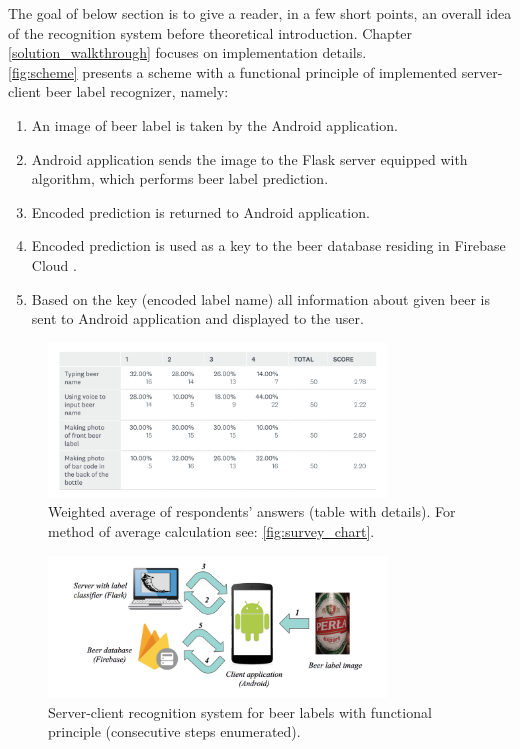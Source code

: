 \documentclass[11pt, a4paper]{article}
\begin{document}
The goal of below section is to give a reader, in a few short points, an overall idea of the recognition system before theoretical introduction. Chapter \ref{solution_walkthrough} focuses on implementation details.\\

\autoref{fig:scheme} presents a scheme with a functional principle of implemented server-client beer label recognizer, namely:
\begin{enumerate}
\item An image of beer label is taken by the Android \cite{android_guide} application. 
\item Android application sends the image to the Flask \cite{flask_docs} server equipped with algorithm, which performs beer label prediction.
\item Encoded prediction is returned to Android application.
\item Encoded prediction is used as a key to the beer database residing in Firebase Cloud \cite{firebase_database_docs}.
\item Based on the key (encoded label name) all information about given beer is sent to Android application and displayed to the user.
\end{enumerate}

\begin{figure}[h]
\includegraphics[width=0.8\textwidth]{survey_table}
\centering
\caption[Średnia ważona respondentów (tabela)]{Weighted average of respondents' answers (table with details). For method of average calculation see: \autoref{fig:survey_chart}.}
\label{fig:survey_table}
\end{figure}

\begin{figure}[h]
\includegraphics[width=0.8\textwidth]{scheme}
\centering
\caption[System rozpoznawania etykiet piwa typu serwer-klient]{Server-client recognition system for beer labels with functional principle (consecutive steps enumerated).}
\label{fig:scheme}
\end{figure}
\clearpage
\end{document}
